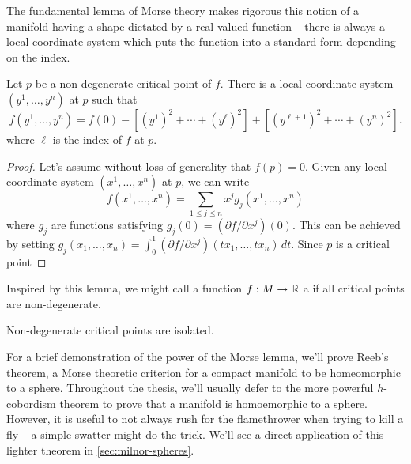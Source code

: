 The fundamental lemma of Morse theory makes rigorous this notion of a manifold having a shape dictated by a real-valued function -- there is always a local coordinate system which puts the function into a standard form depending on the index.

\begin{lemma}\label{lemma:morse}
	Let $p$ be a non-degenerate critical point of $f$. There is a local coordinate system $(y^1,\ldots, y^n)$ at $p$ such that
	\begin{equation}
		f(y^1,\ldots, y^n)=f(0)-\left[(y^1)^2 + \cdots + (y^{\ell})^2\right] + \left[(y^{\ell + 1})^2 + \cdots + (y^n)^2\right].
	\end{equation}
	where $\ell$ is the index of $f$ at $p$.
\end{lemma}
\begin{proof}
	Let's assume without loss of generality that $f(p)=0$. Given any local coordinate system $(x^1,\ldots, x^n)$ at $p$, we can write
	\begin{equation}
		f(x^1,\ldots, x^n) = \sum_{1\leq j \leq n} x^j g_j(x^1,\ldots, x^n)
	\end{equation}
	where $g_j$ are functions satisfying $g_j(0)=(\partial f / \partial x^j)(0)$.
	This can be achieved by setting $g_j(x_1,\ldots, x_n) = \int_0^1 (\partial f/\partial x^j)(tx_1, \ldots, tx_n)\,dt$. Since $p$ is a critical point

\end{proof}

Inspired by this lemma, we might call a function $f : M \to \mathbb{R}$ a  if all critical points are non-degenerate.

\begin{corollary}
	Non-degenerate critical points are isolated.
\end{corollary}

For a brief demonstration of the power of the Morse lemma, we'll prove Reeb's theorem, a Morse theoretic criterion for a compact manifold to be homeomorphic to a sphere. Throughout the thesis, we'll usually defer to the more powerful $h$-cobordism theorem to prove that a manifold is homoemorphic to a sphere.
However, it is useful to not always rush for the flamethrower when trying to kill a fly -- a simple swatter might do the trick. We'll see a direct application of this lighter theorem in \cref{sec:milnor-spheres}.


